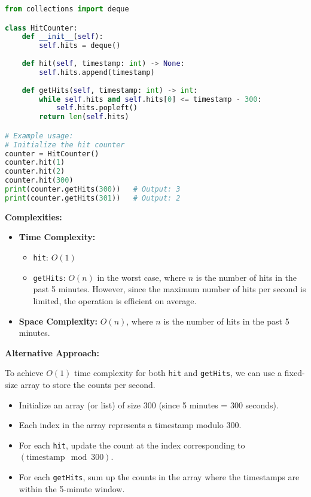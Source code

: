 \begin{fullwidth}
\begin{lstlisting}[language=Python]
from collections import deque

class HitCounter:
    def __init__(self):
        self.hits = deque()
    
    def hit(self, timestamp: int) -> None:
        self.hits.append(timestamp)
    
    def getHits(self, timestamp: int) -> int:
        while self.hits and self.hits[0] <= timestamp - 300:
            self.hits.popleft()
        return len(self.hits)

# Example usage:
# Initialize the hit counter
counter = HitCounter()
counter.hit(1)
counter.hit(2)
counter.hit(300)
print(counter.getHits(300))   # Output: 3
print(counter.getHits(301))   # Output: 2
\end{lstlisting}
\end{fullwidth}

\textbf{Complexities:}

\begin{itemize}
    \item \textbf{Time Complexity:}
        \begin{itemize}
            \item \texttt{hit}: \(O(1)\)
            \item \texttt{getHits}: \(O(n)\) in the worst case, where \(n\) is the number of hits in the past 5 minutes. However, since the maximum number of hits per second is limited, the operation is efficient on average.
        \end{itemize}
    \item \textbf{Space Complexity:} \(O(n)\), where \(n\) is the number of hits in the past 5 minutes.
\end{itemize}

\textbf{Alternative Approach:}

To achieve \(O(1)\) time complexity for both \texttt{hit} and \texttt{getHits}, we can use a fixed-size array to store the counts per second.

\begin{itemize}
    \item Initialize an array (or list) of size 300 (since 5 minutes = 300 seconds).
    \item Each index in the array represents a timestamp modulo 300.
    \item For each \texttt{hit}, update the count at the index corresponding to \((\text{timestamp} \mod 300)\).
    \item For each \texttt{getHits}, sum up the counts in the array where the timestamps are within the 5-minute window.
\end{itemize}

